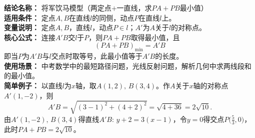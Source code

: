 \textbf{结论名称：} 将军饮马模型（两定点$+$一直线，求$PA+PB$最小值）\\
\textbf{适用条件：} 定点$A,B$在直线$l$的同侧，动点$P$在直线$l$上。\\
\textbf{变量说明：} 定点$A,B$，直线$l$，动点$P\in l$；$A'$为$A$关于$l$的对称点。\\
\textbf{核心公式：} 连接$A'B$交$l$于$P$，则$PA+PB$取得最小值，且
\[
\boxed{(PA+PB)_{\min}=A'B}
\]
即当$P$为$A'B$与$l$交点时取等号，此最小值等于$A'B$的长度。\\
\textbf{使用场景：} 中考数学中的最短路径问题，光线反射问题，解析几何中求两线段和的最小值。\\
\textbf{简单例子：} 以直线$l$为$x$轴，取$A(1,2),\,B(3,4)$。作$A$关于$x$轴的对称点$A'(1,-2)$，则
\[
A'B=\sqrt{(3-1)^2+(4+2)^2}=\sqrt{4+36}=2\sqrt{10}.
\]
由$A'(1,-2),\,B(3,4)$得直线$A'B:\,y+2=3(x-1)$，令$y=0$得交点$P\bigl(\frac{5}{3},0\bigr)$，此时$PA+PB=2\sqrt{10}$。
